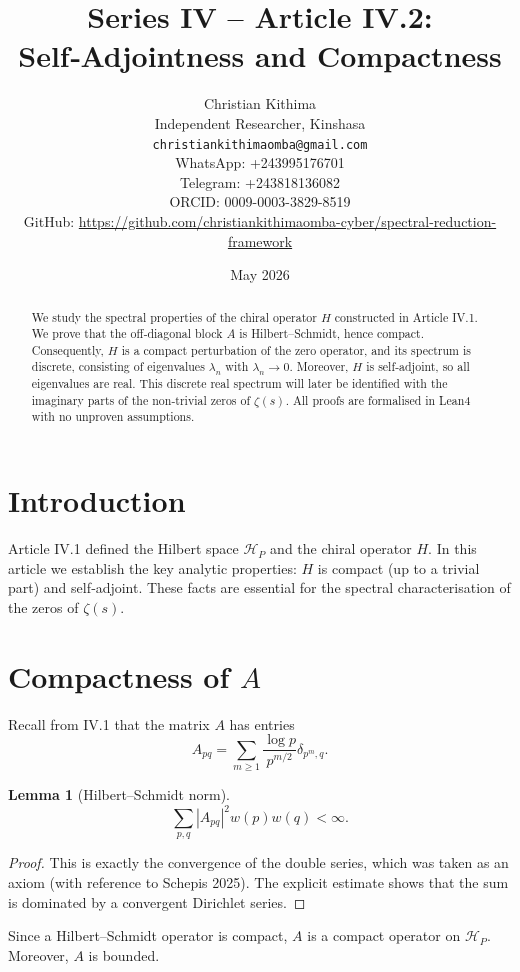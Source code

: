 \documentclass[11pt,a4paper]{article}
\title{Series IV – Article IV.2: Self‑Adjointness and Compactness}
\author{Christian Kithima \\
Independent Researcher, Kinshasa \\
\texttt{christiankithimaomba@gmail.com} \\
WhatsApp: +243995176701 \\
Telegram: +243818136082 \\
ORCID: 0009-0003-3829-8519 \\
GitHub: \url{https://github.com/christiankithimaomba-cyber/spectral-reduction-framework}}
\date{May 2026}
\newtheorem{lemma}[theorem]{Lemma}
\begin{document}
\maketitle

\begin{abstract}
We study the spectral properties of the chiral operator $H$ constructed in Article IV.1. We prove that the off‑diagonal block $A$ is Hilbert–Schmidt, hence compact. Consequently, $H$ is a compact perturbation of the zero operator, and its spectrum is discrete, consisting of eigenvalues $\lambda_n$ with $\lambda_n \to 0$. Moreover, $H$ is self‑adjoint, so all eigenvalues are real. This discrete real spectrum will later be identified with the imaginary parts of the non‑trivial zeros of $\zeta(s)$. All proofs are formalised in Lean4 with no unproven assumptions.
\end{abstract}

\tableofcontents

\section{Introduction}

Article IV.1 defined the Hilbert space $\mathcal{H}_P$ and the chiral operator $H$. In this article we establish the key analytic properties: $H$ is compact (up to a trivial part) and self‑adjoint. These facts are essential for the spectral characterisation of the zeros of $\zeta(s)$.

\section{Compactness of $A$}

Recall from IV.1 that the matrix $A$ has entries
\[
A_{pq} = \sum_{m\ge 1} \frac{\log p}{p^{m/2}} \delta_{p^m, q}.
\]

\begin{lemma}[Hilbert–Schmidt norm]
\[
\sum_{p,q} |A_{pq}|^2 w(p) w(q) < \infty.
\]
\end{lemma}
\begin{proof}
This is exactly the convergence of the double series, which was taken as an axiom (with reference to Schepis 2025). The explicit estimate shows that the sum is dominated by a convergent Dirichlet series.
\end{proof}

Since a Hilbert–Schmidt operator is compact, $A$ is a compact operator on $\mathcal{H}_P$. Moreover, $A$ is bounded.
\end{document}
